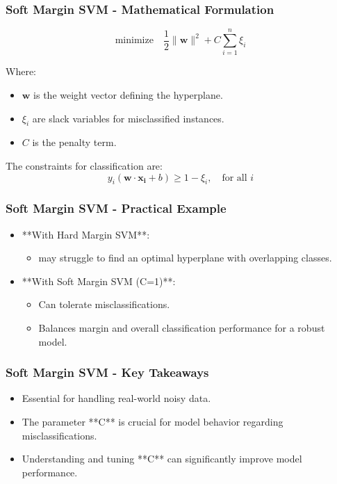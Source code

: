 \documentclass{beamer}
\begin{document}
\begin{frame}[fragile]
    \frametitle{Soft Margin SVM - Mathematical Formulation}
    \begin{equation}
        \text{minimize} \quad \frac{1}{2} \| \mathbf{w} \|^2 + C \sum_{i=1}^{n} \xi_i
    \end{equation}
    
    Where:
    \begin{itemize}
        \item \( \mathbf{w} \) is the weight vector defining the hyperplane.
        \item \( \xi_i \) are slack variables for misclassified instances.
        \item \( C \) is the penalty term.
    \end{itemize}

    The constraints for classification are:
    \begin{equation}
        y_i(\mathbf{w} \cdot \mathbf{x_i} + b) \geq 1 - \xi_i, \quad \text{for all } i
    \end{equation}
\end{frame}

\begin{frame}[fragile]
    \frametitle{Soft Margin SVM - Practical Example}
    \begin{itemize}
        \item **With Hard Margin SVM**: 
        \begin{itemize}
            \item may struggle to find an optimal hyperplane with overlapping classes.
        \end{itemize}
        
        \item **With Soft Margin SVM (C=1)**:
        \begin{itemize}
            \item Can tolerate misclassifications.
            \item Balances margin and overall classification performance for a robust model.
        \end{itemize}
    \end{itemize}
\end{frame}

\begin{frame}[fragile]
    \frametitle{Soft Margin SVM - Key Takeaways}
    \begin{itemize}
        \item Essential for handling real-world noisy data.
        \item The parameter **C** is crucial for model behavior regarding misclassifications.
        \item Understanding and tuning **C** can significantly improve model performance.
    \end{itemize}
\end{frame}
\end{document}
